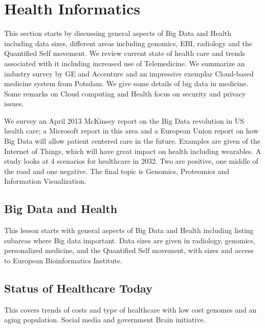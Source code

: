 

\chapter{Health Informatics}

\FILENAME


This section starts by discussing general aspects of Big Data and Health
including data sizes, different areas including genomics, EBI, radiology
and the Quantified Self movement. We review current state of health care
and trends associated with it including increased use of Telemedicine.
We summarize an industry survey by GE and Accenture and an impressive
exemplar Cloud-based medicine system from Potsdam. We give some details
of big data in medicine. Some remarks on Cloud computing and Health
focus on security and privacy issues.

We survey an April 2013 McKinsey report on the Big Data revolution in US
health care; a Microsoft report in this area and a European Union report
on how Big Data will allow patient centered care in the future. Examples
are given of the Internet of Things, which will have great impact on
health including wearables. A study looks at 4 scenarios for healthcare
in 2032. Two are positive, one middle of the road and one negative. The
final topic is Genomics, Proteomics and Information Visualization.

\section{Big Data and Health}\label{big-data-and-health}

This lesson starts with general aspects of Big Data and Health including
listing subareas where Big data important. Data sizes are given in
radiology, genomics, personalized medicine, and the Quantified Self
movement, with sizes and access to European Bioinformatics Institute.


\section{Status of Healthcare Today}

This covers trends of costs and type of healthcare with low cost genomes
and an aging population. Social media and government Brain initiative.

